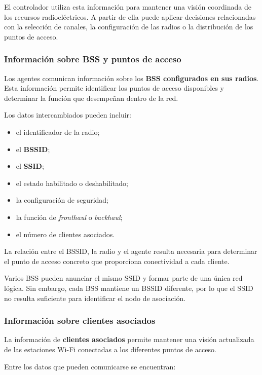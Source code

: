 El controlador utiliza esta información para mantener una visión
coordinada de los recursos radioeléctricos. A partir de ella puede aplicar
decisiones relacionadas con la selección de canales, la configuración de
las radios o la distribución de los puntos de acceso.


\subsubsection*{Información sobre BSS y puntos de acceso}

Los agentes comunican información sobre los
\textbf{BSS configurados en sus radios}. Esta información permite
identificar los puntos de acceso disponibles y determinar la función que
desempeñan dentro de la red.

Los datos intercambiados pueden incluir:

\begin{itemize}
    \item el identificador de la radio;
    \item el \textbf{BSSID};
    \item el \textbf{SSID};
    \item el estado habilitado o deshabilitado;
    \item la configuración de seguridad;
    \item la función de \textit{fronthaul} o
    \textit{backhaul};
    \item el número de clientes asociados.
\end{itemize}

La relación entre el BSSID, la radio y el agente resulta necesaria para
determinar el punto de acceso concreto que proporciona conectividad a
cada cliente.

Varios BSS pueden anunciar el mismo SSID y formar parte de una única red
lógica. Sin embargo, cada BSS mantiene un BSSID diferente, por lo que el
SSID no resulta suficiente para identificar el nodo de asociación.


\subsubsection*{Información sobre clientes asociados}

La información de \textbf{clientes asociados} permite mantener una visión
actualizada de las estaciones Wi-Fi conectadas a los diferentes puntos
de acceso.

Entre los datos que pueden comunicarse se encuentran:

